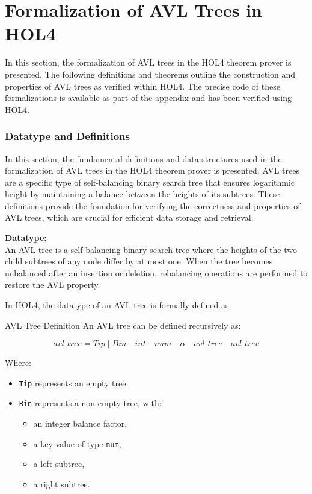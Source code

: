 \chapter{Formalization of AVL Trees in HOL4}\label{chap:relatedWork}

In this section, the formalization of AVL trees in the HOL4 theorem prover is presented. The following definitions and theorems outline the construction and properties of AVL trees as verified within HOL4. The precise code of these formalizations is available as part of the appendix and has been verified using HOL4.

\subsection{Datatype and Definitions}

In this section, the fundamental definitions and data structures used in the formalization of AVL trees in the HOL4 theorem prover is presented. AVL trees are a specific type of self-balancing binary search tree that ensures logarithmic height by maintaining a balance between the heights of its subtrees. These definitions provide the foundation for verifying the correctness and properties of AVL trees, which are crucial for efficient data storage and retrieval.

\textbf{Datatype:} \\
An AVL tree is a self-balancing binary search tree where the heights of the two child subtrees of any node differ by at most one. When the tree becomes unbalanced after an insertion or deletion, rebalancing operations are performed to restore the AVL property.

In HOL4, the datatype of an AVL tree is formally defined as:

\begin{defn}{AVL Tree Definition}
An AVL tree can be defined recursively as:

\[
    avl\_tree = Tip \mid Bin \quad \mathit{int} \quad \mathit{num} \quad \alpha \quad avl\_tree \quad avl\_tree
\]

Where:
\begin{itemize}
    \item \texttt{Tip} represents an empty tree.
    \item \texttt{Bin} represents a non-empty tree, with:
    \begin{itemize}
        \item an integer balance factor,
        \item a key value of type \texttt{num},
        \item a left subtree,
        \item a right subtree.
    \end{itemize}
\end{itemize}
\end{defn}

